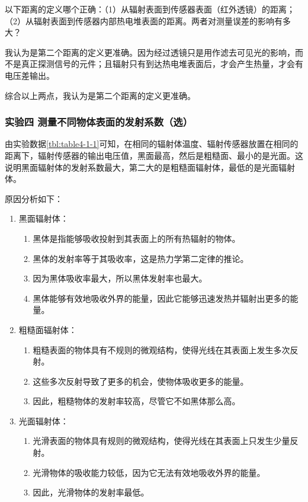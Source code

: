 \documentclass[dvipsnames, svgnames,a4paper,11pt]{article}
\begin{document}
	\begin{question}
		以下距离的定义哪个正确：（1）从辐射表面到传感器表面（红外透镜）的距离；（2）从辐射表面到传感器内部热电堆表面的距离。两者对测量误差的影响有多大？
	\end{question}

	我认为是第二个距离的定义更准确。因为经过透镜只是用作滤去可见光的影响，而不是真正探测信号的元件；且辐射只有到达热电堆表面后，才会产生热量，才会有电压差输出。

	综合以上两点，我认为是第二个距离的定义更准确。

	


	\subsubsection{实验四 \quad 测量不同物体表面的发射系数（选）}


	由实验数据\cref{tbl:table4-1-1}可知，在相同的辐射体温度、辐射传感器放置在相同的距离下，辐射传感器的输出电压值，黑面最高，然后是粗糙面、最小的是光面。这说明黑面辐射体的发射系数最大，第二大的是粗糙面辐射体，最低的是光面辐射体。

	原因分析如下：
	\begin{enumerate}
		\item 黑面辐射体：
			\begin{enumerate}[label=\roman*.]
				\item 黑体是指能够吸收投射到其表面上的所有热辐射的物体。
				\item 黑体的发射率等于其吸收率，这是热力学第二定律的推论。
				\item 因为黑体吸收率最大，所以黑体发射率也最大。
				\item 黑体能够有效地吸收外界的能量，因此它能够迅速发热并辐射出更多的能量。
			\end{enumerate}
			
		\item 粗糙面辐射体：
			\begin{enumerate}[label=\roman*.]
				\item 粗糙表面的物体具有不规则的微观结构，使得光线在其表面上发生多次反射。
				\item 这些多次反射导致了更多的机会，使物体吸收更多的能量。
				\item 因此，粗糙物体的发射率较高，尽管它不如黑体那么高。
			\end{enumerate}
			
		\item 光面辐射体：
			\begin{enumerate}[label=\roman*.]
				\item 光滑表面的物体具有规则的微观结构，使得光线在其表面上只发生少量反射。
				\item 光滑物体的吸收能力较低，因为它无法有效地吸收外界的能量。
				\item 因此，光滑物体的发射率最低。
			\end{enumerate}
			
			
	\end{enumerate}
	
\end{document}
